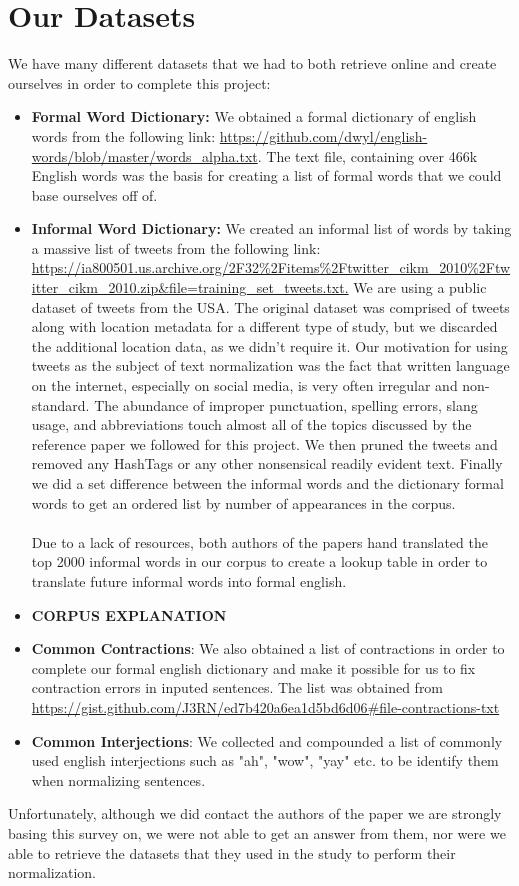 \documentclass{article}
\begin{document}
\section{Our Datasets}
We have many different datasets that we had to both retrieve online and create ourselves in order to complete this project:
\begin{itemize}
	\item \textbf{Formal Word Dictionary:} We obtained a formal dictionary of english words from the following link: \url{https://github.com/dwyl/english-words/blob/master/words_alpha.txt}. The text file, containing over 466k English words was the basis for creating a list of formal words that we could base ourselves off of.
	\item \textbf{Informal Word Dictionary:} We created an informal list of words by taking a massive list of tweets from the following link: \url{https://ia800501.us.archive.org/2F32%2Fitems%2Ftwitter_cikm_2010%2Ftwitter_cikm_2010.zip&file=training_set_tweets.txt.}  We are using a public dataset of tweets from the USA. The original dataset was comprised of tweets along with location metadata for a different type of study, but we discarded the additional location data, as we didn’t require it. Our motivation for using tweets as the subject of text normalization was the fact that written language on the internet, especially on social media, is very often irregular and non-standard. The abundance of improper punctuation, spelling errors, slang usage, and abbreviations touch almost all of the topics discussed by the reference paper we followed for this project. We then  pruned the tweets and removed any HashTags or any other nonsensical readily evident text. Finally we did a set difference between the informal words and the dictionary formal words to get an ordered list by number of appearances in the corpus. \\\\
	Due to a lack of resources, both authors of the papers hand translated the top 2000 informal words in our corpus to create a lookup table in order to translate future informal words into formal english.
	\item \textbf{CORPUS EXPLANATION}
	\item \textbf{Common Contractions}: We also obtained a list of contractions in order to complete our formal english dictionary and make it possible for us to fix contraction errors in inputed sentences. The list was obtained from \url{https://gist.github.com/J3RN/ed7b420a6ea1d5bd6d06#file-contractions-txt}
	\item \textbf{Common Interjections}: We collected and compounded a list of commonly used english interjections such as "ah", "wow", "yay" etc. to be identify them when normalizing sentences.
\end{itemize}
Unfortunately, although we did contact the authors of the paper we are strongly basing this survey on, we were not able to get an answer from them, nor were we able to retrieve the datasets that they used in the study to perform their normalization.
\end{document}
